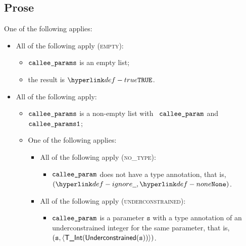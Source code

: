 \documentclass{book}
\newcommand\vs[0]{\texttt{s}}
\begin{document}
\subsection{Prose}
One of the following applies:
\begin{itemize}
  \item All of the following apply (\textsc{empty}):
  \begin{itemize}
    \item $\texttt{callee\_params}$ is an empty list;
    \item the result is $\True$.
  \end{itemize}

  \item All of the following apply:
  \begin{itemize}
    \item $\texttt{callee\_params}$ is a non-empty list with \head\ $\texttt{callee\_param}$ and \tail\ \\
          $\texttt{callee\_params1}$;
    \item One of the following applies:
    \begin{itemize}
      \item All of the following apply (\textsc{no\_type}):
      \begin{itemize}
        \item $\texttt{callee\_param}$ does not have a type annotation, that is, $(\Ignore, \None)$.
      \end{itemize}

      \item All of the following apply (\textsc{underconstrained}):
      \begin{itemize}
        \item $\texttt{callee\_param}$ is a parameter $\vs$ with a type annotation of an
              underconstrained integer for the same parameter, that is, \\
              $(\vs, \langle\TInt(\underconstrained(\vs))\rangle)$.
      \end{itemize}


\end{itemize}
\end{itemize}
\end{itemize}
\end{document}
